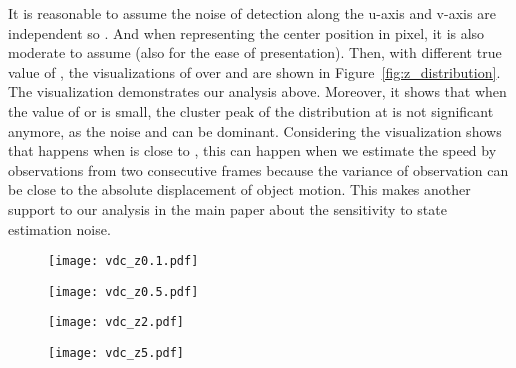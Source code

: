 \documentclass[10pt,twocolumn,letterpaper]{article}
\begin{document}
It is reasonable to assume the noise of detection along the u-axis and v-axis are independent so . And when representing the center position in pixel, it is also moderate to assume  (also for the ease of presentation). Then, with different true value of , the visualizations of  over  and  are shown in Figure~\ref{fig:z_distribution}. The visualization demonstrates our analysis above. Moreover, it shows that when the value of  or  is small, the cluster peak of the distribution at  is not significant anymore, as the noise  and  can be dominant. Considering the visualization shows that happens when   is close to , this can happen when we estimate the speed by observations from two consecutive frames because the variance of observation can be close to the absolute displacement of object motion. This makes another support to our analysis in the main paper about the sensitivity to state estimation noise.

\begin{figure*}
\begin{subfigure}[t]{.235\textwidth}
    \centering
    \texttt{[image: vdc\_z0.1.pdf]}
    \caption{}
  \end{subfigure}
  \hfill
  \begin{subfigure}[t]{.235\textwidth}
    \centering
    \texttt{[image: vdc\_z0.5.pdf]}
    \caption{}
  \end{subfigure}
  \hfill
  \begin{subfigure}[t]{.235\textwidth}
    \centering
    \texttt{[image: vdc\_z2.pdf]}
    \caption{}
  \end{subfigure}
  \hfill
  \begin{subfigure}[t]{.235\textwidth}
    \centering
    \texttt{[image: vdc\_z5.pdf]}
    \caption{}
  \end{subfigure}
  \caption{The probability density of  under different true value of , i.e. . We set  and  as two variables. It shows that under different settings of true velocity direction when  is smaller, the probability of estimated value with a significant shift from the true value is higher. As  is proportional to the time difference of the two selected observations under linear motion assumption, it relates to the case that the two steps for velocity direction estimation has a shorter time difference.}
  \label{fig:z_distribution}
\end{figure*}
\end{document}
